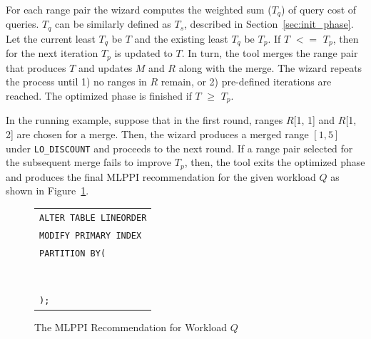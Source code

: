 \documentclass[paper]{ieice}
\def\range#1{$[{#1}]$}
\begin{document}
For each range pair the wizard computes the weighted sum ($T_{q}$) of query cost of queries. 
$T_{q}$ can be similarly defined as $T_{s}$, described in Section~\ref{sec:init_phase}.
Let the current least $T_{q}$ be $T$ and the existing least $T_{q}$ be $T_{p}$. 
If $T$ $<=$ $T_{p}$, then for the next iteration $T_{p}$ is updated to $T$. 
In turn, the tool merges the range pair that produces $T$ and updates $M$ and $R$ along with the merge. 
The wizard repeats the process until 1) no ranges in $R$ remain, or 2) pre-defined iterations are reached. 
The optimized phase is finished if $T$ $\geq$ $T_{p}$.  

In the running example, suppose that in the first round, ranges $R$[1, 1] and $R$[1, 2] are chosen for a merge. 
Then, the wizard produces a merged range \range{1, 5} \hbox{under} {\tt LO\_DISCOUNT} and proceeds to the next round. 
If a range pair selected for the subsequent merge fails to improve $T_{p}$, 
then, the tool exits the optimized phase and \hbox{produces} the final MLPPI recommendation for the given workload $Q$ 
as shown in Figure~\ref{fig:mlppi}. 

\vspace{-.1in}

\begin{figure}[htp!]
\begin{center}
\begin{tabular}{|l|} \hline
{\tt ALTER TABLE LINEORDER} \\
{\tt MODIFY PRIMARY INDEX} \\
{\tt PARTITION BY(} \\
\hspace{.1in}{\tt CASE\_N(} \\
	\hspace{.2in}{\tt LO\_DISCOUNT $\geq$ 1 AND LO\_DISCOUNT $\leq$ 5,} \\
	\hspace{.2in}{\tt LO\_DISCOUNT $\geq$ 7,} \\ 
	\hspace{.2in}{\tt NO CASE OR UNKNOWN),} \\
\hspace{.1in}{\tt CASE\_N(} \\
	\hspace{.2in}{\tt LO\_QUANTITY $<$ 25,} \\
	\hspace{.2in}{\tt LO\_QUANTITY $\geq$ 25 AND LO\_QUANTITY $\leq$ 35,} \\
	\hspace{.2in}{\tt NO CASE OR UNKNOWN)} \\ 
{\tt );} \\ \hline
\end{tabular}
\end{center}
\caption{The MLPPI Recommendation for Workload $Q$\label{fig:mlppi}}
\end{figure}
\end{document}
